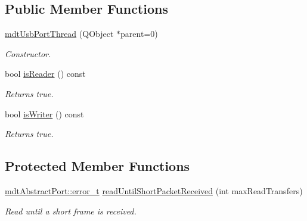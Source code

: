 \subsection*{Public Member Functions}
\begin{DoxyCompactItemize}
\item 
\hypertarget{classmdt_usb_port_thread_aaf4e5883224f05d80132b31a921ac899}{
\hyperlink{classmdt_usb_port_thread_aaf4e5883224f05d80132b31a921ac899}{mdtUsbPortThread} (QObject $\ast$parent=0)}
\label{classmdt_usb_port_thread_aaf4e5883224f05d80132b31a921ac899}

\begin{DoxyCompactList}\small\item\em Constructor. \end{DoxyCompactList}\item 
\hypertarget{classmdt_usb_port_thread_aed82b57c84745f1e2391750697db1022}{
bool \hyperlink{classmdt_usb_port_thread_aed82b57c84745f1e2391750697db1022}{isReader} () const }
\label{classmdt_usb_port_thread_aed82b57c84745f1e2391750697db1022}

\begin{DoxyCompactList}\small\item\em Returns true. \end{DoxyCompactList}\item 
\hypertarget{classmdt_usb_port_thread_a74258f300967b5dea1fbfa9a0ccab38a}{
bool \hyperlink{classmdt_usb_port_thread_a74258f300967b5dea1fbfa9a0ccab38a}{isWriter} () const }
\label{classmdt_usb_port_thread_a74258f300967b5dea1fbfa9a0ccab38a}

\begin{DoxyCompactList}\small\item\em Returns true. \end{DoxyCompactList}\end{DoxyCompactItemize}
\subsection*{Protected Member Functions}
\begin{DoxyCompactItemize}
\item 
\hyperlink{classmdt_abstract_port_ad4121bb930c95887e77f8bafa065a85e}{mdtAbstractPort::error\_\-t} \hyperlink{classmdt_usb_port_thread_acca2af9704cc6894ec5b2058ca102af1}{readUntilShortPacketReceived} (int maxReadTransfers)
\begin{DoxyCompactList}\small\item\em Read until a short frame is received. \end{DoxyCompactList}\end{DoxyCompactItemize}


